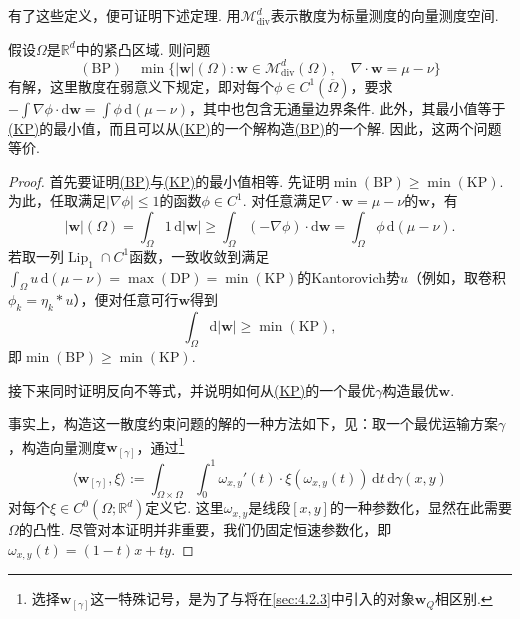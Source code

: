 有了这些定义，便可证明下述定理. 用$\mathscr M^d_{\mathrm{div}}$表示散度为标量测度的向量测度空间.

\begin{theorem}\label{obj:4.6}
假设$\Omega$是$\mathbb R^d$中的紧凸区域. 则问题
\[
 (\mathrm{BP})\quad
 \min\bigl\{|\mathbf w|(\Omega):
     \mathbf w\in\mathscr M^d_{\mathrm{div}}(\Omega),\quad
     \nabla\cdot\mathbf w=\mu-\nu\bigr\}
\]
有解，这里散度在弱意义下规定，即对每个$\phi\in C^1(\overline\Omega)$，要求$-\int\nabla\phi\cdot\mathrm d\mathbf w=\int\phi\,\mathrm d(\mu-\nu)$，其中也包含无通量边界条件. 此外，其最小值等于\hyperref[obj:1.2]{(KP)}的最小值，而且可以从\hyperref[obj:1.2]{(KP)}的一个解构造\hyperref[obj:4.5]{(BP)}的一个解. 因此，这两个问题等价.
\end{theorem}
\begin{proof}
首先要证明\hyperref[obj:4.5]{(BP)}与\hyperref[obj:1.2]{(KP)}的最小值相等. 先证明$\min\hyperref[obj:4.5]{(\mathrm{BP})}\geq\min\hyperref[obj:1.2]{(\mathrm{KP})}$. 为此，任取满足$|\nabla\phi|\leq1$的函数$\phi\in C^1$. 对任意满足$\nabla\cdot\mathbf w=\mu-\nu$的$\mathbf w$，有
\[
 |\mathbf w|(\Omega)=\int_\Omega1\,\mathrm d|\mathbf w|
 \geq\int_\Omega(-\nabla\phi)\cdot\mathrm d\mathbf w
 =\int_\Omega\phi\,\mathrm d(\mu-\nu).
\]
\label{idx:root4-p131-duality}若取一列$\operatorname{Lip}_1\cap C^1$函数，一致收敛到满足$\int_\Omega u\,\mathrm d(\mu-\nu)=\max\hyperref[obj:1.9]{(\mathrm{DP})}=\min\hyperref[obj:1.2]{(\mathrm{KP})}$的Kantorovich势$u$（例如，取卷积$\phi_k=\eta_k*u$），便对任意可行$\mathbf w$得到
\[
 \int_\Omega\mathrm d|\mathbf w|\geq\min\hyperref[obj:1.2]{(\mathrm{KP})},
\]
即$\min\hyperref[obj:4.5]{(\mathrm{BP})}\geq\min\hyperref[obj:1.2]{(\mathrm{KP})}$.

接下来同时证明反向不等式，并说明如何从\hyperref[obj:1.2]{(KP)}的一个最优$\gamma$构造最优$\mathbf w$.

事实上，构造这一散度约束问题的解的一种方法如下，见\cite{b70}：取一个最优运输方案$\gamma$，构造向量测度$\mathbf w_{[\gamma]}$，通过\footnote{选择$\mathbf w_{[\gamma]}$这一特殊记号，是为了与将在\autoref{sec:4.2.3}中引入的对象$\mathbf w_Q$相区别.}
\[
 \langle\mathbf w_{[\gamma]},\xi\rangle
 :=\int_{\Omega\times\Omega}\int_0^1
     \omega_{x,y}'(t)\cdot\xi(\omega_{x,y}(t))\,\mathrm dt\,\mathrm d\gamma(x,y)
\]
对每个$\xi\in C^0(\Omega;\mathbb R^d)$定义它. 这里$\omega_{x,y}$是线段$[x,y]$的一种参数化，显然在此需要$\Omega$的凸性. 尽管对本证明并非重要，我们仍固定恒速参数化，即$\omega_{x,y}(t)=(1-t)x+ty$.


\end{proof}
